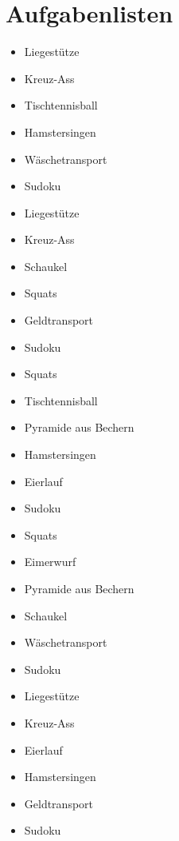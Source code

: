 \section{Aufgabenlisten}
\newpage

\begin{itemize}[label=$\bigcirc$]
    \item Liegestütze
    \item Kreuz-Ass
    \item Tischtennisball
    \item Hamstersingen
    \item Wäschetransport
    \item Sudoku
\end{itemize}
\newpage

\begin{itemize}[label=$\bigcirc$]
    \item Liegestütze 
    \item Kreuz-Ass
    \item Schaukel
    \item Squats
    \item Geldtransport
    \item Sudoku
\end{itemize}
\newpage

\begin{itemize}[label=$\bigcirc$]
    \item Squats 
    \item Tischtennisball
    \item Pyramide aus Bechern
    \item Hamstersingen
    \item Eierlauf
    \item Sudoku
\end{itemize}
\newpage

\begin{itemize}[label=$\bigcirc$]
    \item Squats 
    \item Eimerwurf
    \item Pyramide aus Bechern
    \item Schaukel
    \item Wäschetransport
    \item Sudoku
\end{itemize}
\newpage

\begin{itemize}[label=$\bigcirc$]
    \item Liegestütze
    \item Kreuz-Ass
    \item Eierlauf
    \item Hamstersingen
    \item Geldtransport
    \item Sudoku
\end{itemize}
\newpage

